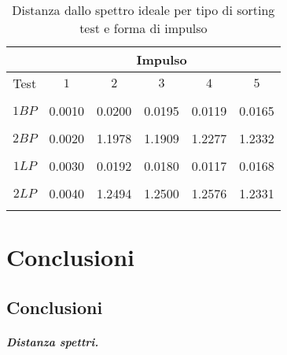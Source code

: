\begin{table}%
\begin{center}
\begin{tabular}{|c|c|c|c|c|c|}

\hline
      & \multicolumn{5}{|c|}{Impulso}    \\
      \hline
Test  &  $1$  &  $2$ &   $3$ &   $4$ &   $5$ \\
      &       &      &       &       &       \\

  $1BP$  &  0.0010  &  0.0200 &   0.0195 &   0.0119 &   0.0165 \\
  &   &  &    &    &    \\
$2BP$  &  0.0020  &  1.1978 &   1.1909 &   1.2277 &   1.2332 \\
&   &  &    &    &    \\
$1LP$  &  0.0030  &  0.0192 &   0.0180 &   0.0117 &   0.0168 \\
&   &  &    &    &    \\
$2LP$  &  0.0040  &  1.2494 &   1.2500 &   1.2576 &   1.2331 \\
&   &  &    &    &    \\

         
         
\hline

\end{tabular}
\caption[Distanza dallo spettro ideale per tipo di sorting test e forma di impulso]
{Distanza dallo spettro ideale per tipo di sorting test e forma di impulso}
\label{tab:DFTdiff}
\end{center}
\end{table}







\chapter{Conclusioni}
\label{capitolo:conclusioni}
\graphicspath{{Graph/}}


\section{Conclusioni}


\paragraph{Distanza spettri.}


